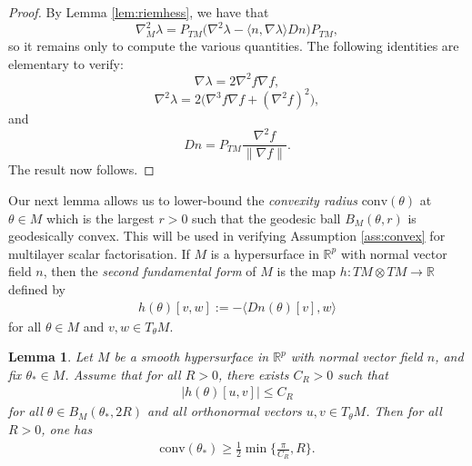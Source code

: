 \documentclass{article}
\newcommand{\RB}{\mathbb{R}}
\theoremstyle{plain}
\newtheorem{lemma}[theorem]{Lemma}
\theoremstyle{definition}
\theoremstyle{remark}
\begin{document}
\begin{proof}
    By Lemma \ref{lem:riemhess}, we have that
    \begin{equation}
        \nabla^2_M\lambda = P_{TM}\big(\nabla^2\lambda - \langle n,\nabla\lambda\rangle Dn\big)P_{TM},
    \end{equation}
    so it remains only to compute the various quantities. The following identities are elementary to verify:
    \begin{equation}
        \nabla\lambda = 2\nabla^2f\nabla f,
    \end{equation}
    \begin{equation}
        \nabla^2\lambda = 2\big(\nabla^3 f\nabla f+(\nabla^2f)^2\big),
    \end{equation}
    and
    \begin{equation}
        Dn = P_{TM}\frac{\nabla^2f}{\|\nabla f\|}.
    \end{equation}
    The result now follows.
\end{proof}

Our next lemma allows us to lower-bound the \emph{convexity radius} $\text{conv}(\theta)$ at $\theta\in M$ which is the largest $r>0$ such that the geodesic ball $B_M(\theta,r)$ is geodesically convex. This will be used in verifying Assumption \ref{ass:convex} for multilayer scalar factorisation. If $M$ is a hypersurface in $\RB^p$ with normal vector field $n$, then the \emph{second fundamental form} of $M$ is the map $h:TM\otimes TM\rightarrow\RB$ defined by
\begin{align}
    h(\theta)[v,w]:=-\langle Dn(\theta)[v],w\rangle
\end{align}
for all $\theta\in M$ and $v,w\in T_{\theta}M$.

\begin{lemma}\label{lem:convexityradius}
    Let $M$ be a smooth hypersurface in $\RB^p$ with normal vector field $n$, and fix $\theta_*\in M$. Assume that for all $R>0$, there exists $C_R>0$ such that
    \begin{align}
        |h(\theta)[u,v]|\leq C_R
    \end{align}
    for all $\theta\in B_M(\theta_*,2R)$ and all orthonormal vectors $u,v\in T_{\theta}M$. Then for all $R>0$, one has
    \begin{align}
        \mathrm{conv}(\theta_*)\geq \frac{1}{2}\min\bigg\{\frac{\pi}{C_R},R\bigg\}.
    \end{align}
\end{lemma}
\end{document}
